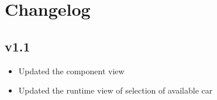 \chapter{Changelog}

\section{v1.1}
\begin{itemize}
	\item Updated the component view 
	\item Updated the runtime view of selection of available car
\end{itemize}